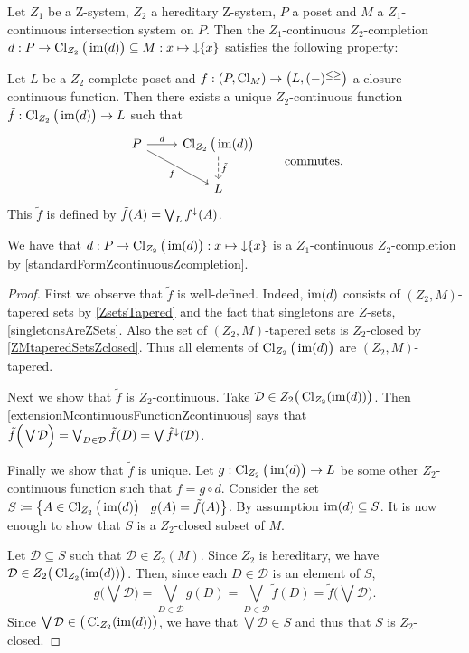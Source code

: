 \begin{proposition} \label{ZcontinuousExtension}
Let $Z_1$ be a $\mathrm{Z}$-system, $Z_2$ a hereditary $\mathrm{Z}$-system, $P$ a poset and $M$ a $Z_1$-continuous intersection system on $P$. Then the $Z_1$-continuous $Z_2$-completion $d: P \to \operatorname{Cl}_{Z_2}\big(\operatorname{im}(d)\big) \subseteq M: x\mapsto \operatorname{\downarrow}\{x\}$ satisfies the following property:

Let $L$ be a $Z_2$-complete poset and $f: \sSet{P, \Closure_M}\to \sSet{L, (-)^{\leq\geq}}$ a closure-continuous function. Then there exists a unique $Z_2$-continuous function $\tilde{f}: \operatorname{Cl}_{Z_2}\big(\operatorname{im}(d)\big) \to L$ such that
\[ \begin{tikzcd}
P \ar[r, "d"] \ar[dr, swap, "f"] & \Closure_{Z_2}\big(\im(d)\big) \ar[d, dashed, "{\tilde{f}}"] \\ {} & L
\end{tikzcd} \qquad \text{commutes.} \]
This $\tilde{f}$ is defined by $\tilde{f}(A) = \bigvee_L f^\downarrow(A)$.
\end{proposition}
We have that $d: P \to \operatorname{Cl}_{Z_2}\big(\operatorname{im}(d)\big): x\mapsto \operatorname{\downarrow}\{x\}$ is a $Z_1$-continuous $Z_2$-completion by \ref{standardFormZcontinuousZcompletion}.
\begin{proof}
First we observe that $\tilde{f}$ is well-defined. Indeed, $\operatorname{im}(d)$ consists of $(Z_2, M)$-tapered sets by \ref{ZsetsTapered} and the fact that singletons are $Z$-sets, \ref{singletonsAreZSets}. Also the set of $(Z_2, M)$-tapered sets is $Z_2$-closed by \ref{ZMtaperedSetsZclosed}. Thus all elements of $\operatorname{Cl}_{Z_2}\big(\operatorname{im}(d)\big)$ are $(Z_2, M)$-tapered.

Next we show that $\tilde{f}$ is $Z_2$-continuous. Take $\mathcal{D} \in Z_2\big(\operatorname{Cl}_{Z_2}(\operatorname{im}(d))\big)$. Then \ref{extensionMcontinuousFunctionZcontinuous} says that $\tilde{f}\Big(\bigvee \mathcal{D}\Big) = \bigvee_{D\in \mathcal{D}}\tilde{f}(D) = \bigvee\tilde{f}^\downarrow(\mathcal{D})$.

Finally we show that $\tilde{f}$ is unique. Let $g: \operatorname{Cl}_{Z_2}\big(\operatorname{im}(d)\big) \to L$ be some other $Z_2$-continuous function such that $f = g\circ d$. Consider the set $S\defeq\setbuilder{A\in \Closure_{Z_2}\big(\im(d)\big)}{g(A) = \tilde{f}(A)}$. By assumption $\operatorname{im}(d) \subseteq S$. It is now enough to show that $S$ is a $Z_2$-closed subset of $M$.

Let $\mathcal{D} \subseteq S$ such that $\mathcal{D} \in Z_2(M)$. Since $Z_2$ is hereditary, we have $\mathcal{D} \in Z_2\big(\operatorname{Cl}_{Z_2}(\operatorname{im}(d))\big)$. Then, since each $D\in\mathcal{D}$ is an element of $S$,
\[ g\Big(\bigvee \mathcal{D}\Big) = \bigvee_{D\in \mathcal{D}}g(D) = \bigvee_{D\in \mathcal{D}}\tilde{f}(D) = \tilde{f}\Big(\bigvee \mathcal{D}\Big). \]
Since $\bigvee \mathcal{D}\in \big(\operatorname{Cl}_{Z_2}(\operatorname{im}(d))\big)$, we have that $\bigvee \mathcal{D} \in S$ and thus that $S$ is $Z_2$-closed.
\end{proof}

